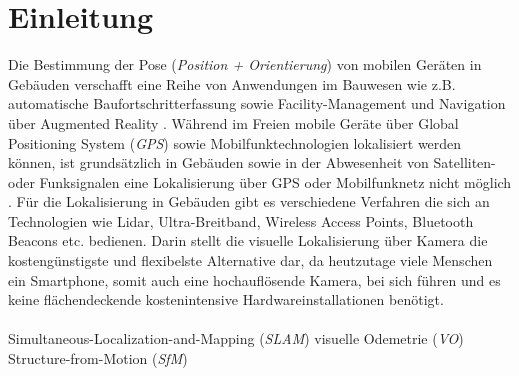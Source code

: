
\section{Einleitung}
%
%
%
%
%
%
%
%
%
%
%
%
%
%


Die Bestimmung der Pose (\textit{Position + Orientierung}) von mobilen Geräten in Gebäuden verschafft eine Reihe von Anwendungen im Bauwesen wie z.B. automatische Baufortschritterfassung sowie Facility-Management und Navigation über Augmented Reality \cite{kroppModelbasedPoseEstimation2016, kochNaturalMarkersAugmented2014}.
Während im Freien mobile Geräte über Global Positioning System (\textit{GPS}) sowie Mobilfunktechnologien lokalisiert werden können, ist grundsätzlich in Gebäuden sowie in der Abwesenheit von Satelliten- oder Funksignalen eine Lokalisierung über GPS oder Mobilfunknetz nicht möglich \cite{yassinRecentAdvancesIndoor2016}. Für die Lokalisierung in Gebäuden gibt es verschiedene Verfahren die sich an Technologien wie Lidar, Ultra-Breitband, Wireless Access Points, Bluetooth Beacons etc. bedienen. Darin stellt die visuelle Lokalisierung über Kamera die kostengünstigste und flexibelste Alternative dar, da heutzutage viele Menschen ein Smartphone, somit auch eine hochauflösende Kamera, bei sich führen und es keine flächendeckende kostenintensive Hardwareinstallationen benötigt.
\\\\

Simultaneous-Localization-and-Mapping (\textit{SLAM})
visuelle Odemetrie (\textit{VO})
Structure-from-Motion (\textit{SfM})

